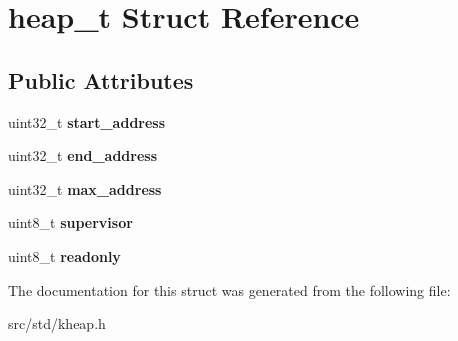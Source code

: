 \hypertarget{structheap__t}{}\section{heap\+\_\+t Struct Reference}
\label{structheap__t}
\subsection*{Public Attributes}
\begin{DoxyCompactItemize}
\item 
\mbox{\label{structheap__t_a31fe3faaa32584ab844cfa2acdf1a3ec}} 
uint32\+\_\+t {\bfseries start\+\_\+address}
\item 
\mbox{\label{structheap__t_afc97c528817106c94d227fe46b01eab1}} 
uint32\+\_\+t {\bfseries end\+\_\+address}
\item 
\mbox{\label{structheap__t_a7357d3fa381a9953b9fd5c0258bb240d}} 
uint32\+\_\+t {\bfseries max\+\_\+address}
\item 
\mbox{\label{structheap__t_ad34980d0a3c706bcf4533535b28a049e}} 
uint8\+\_\+t {\bfseries supervisor}
\item 
\mbox{\label{structheap__t_a9355c341ff193eedcfb46c88dc3156f8}} 
uint8\+\_\+t {\bfseries readonly}
\end{DoxyCompactItemize}


The documentation for this struct was generated from the following file\+:\begin{DoxyCompactItemize}
\item 
src/std/kheap.\+h\end{DoxyCompactItemize}
